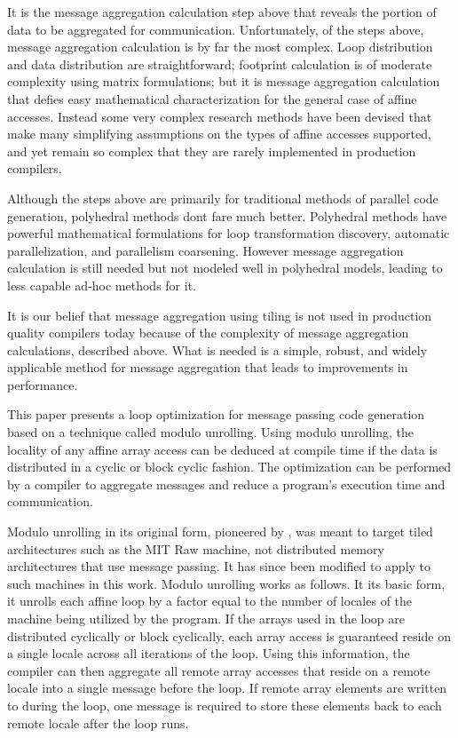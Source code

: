 It is the message aggregation calculation step above that reveals the portion of data to be aggregated for communication. Unfortunately, of the steps above, message aggregation calculation is by far the most complex. Loop distribution and data distribution are straightforward; footprint calculation is of moderate complexity using matrix formulations; but it is message aggregation calculation that defies easy mathematical characterization for the general case of affine accesses. Instead some very complex research methods \cite{goumas2006message, xue1997communication} have been devised that make many simplifying assumptions on the types of affine accesses supported, and yet remain so complex that they are rarely implemented in production compilers.

Although the steps above are primarily for traditional methods of parallel code generation, polyhedral methods dont fare much better. Polyhedral methods have powerful mathematical formulations for loop transformation discovery, automatic parallelization, and parallelism coarsening. However message aggregation calculation is still needed but not modeled well in polyhedral models, leading to less capable ad-hoc methods for it.

It is our belief that message aggregation using tiling is not used in production quality compilers today because of the complexity of message aggregation calculations, described above. What is needed is a simple, robust, and widely applicable method for message aggregation that leads to improvements in performance. 

This paper presents a loop optimization for message passing code generation based on a technique called modulo unrolling. Using modulo unrolling, the locality of any affine array access can be deduced at compile time if the data is distributed in a cyclic or block cyclic fashion. The optimization can be performed by a compiler to aggregate messages and reduce a program's execution time and communication. 

Modulo unrolling in its original form, pioneered by \cite{barua1999maps}, was meant to target tiled architectures such as the MIT Raw machine, not distributed memory architectures that use message passing. It has since been modified to apply to such machines in this work. Modulo unrolling works as follows. It its basic form, it unrolls each affine loop by a factor equal to the number of locales of the machine being utilized by the program. If the arrays used in the loop are distributed cyclically or block cyclically, each array access is guaranteed reside on a single locale across all iterations of the loop. Using this information, the compiler can then aggregate all remote array accesses that reside on a remote locale into a single message before the loop. If remote array elements are written to during the loop, one message is required to store these elements back to each remote locale after the loop runs. 

